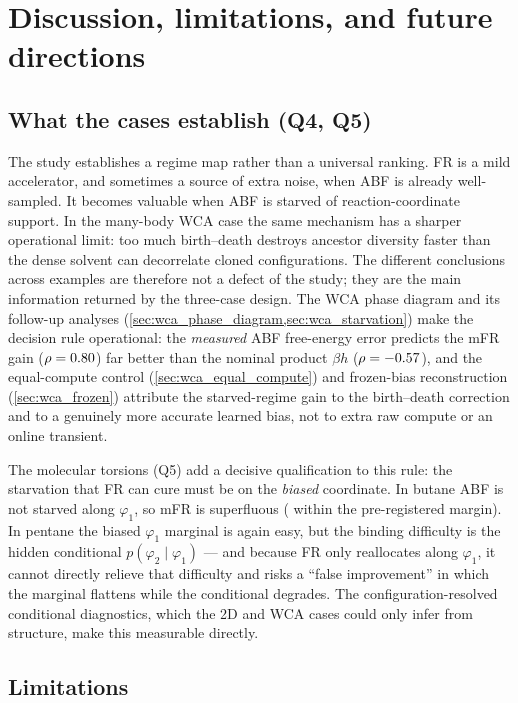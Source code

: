 \section{Discussion, limitations, and future directions}
\label{sec:discussion}

\subsection{What the cases establish (Q4, Q5)}
The study establishes a regime map rather than a universal ranking. FR is a mild
accelerator, and sometimes a source of extra noise, when ABF is already
well-sampled. It becomes valuable when ABF is starved of reaction-coordinate
support. In the many-body WCA case the same mechanism has a sharper operational
limit: too much birth--death destroys ancestor diversity faster than the dense
solvent can decorrelate cloned configurations. The different conclusions across
examples are therefore not a defect of the study; they are the main information
returned by the three-case design. The WCA phase diagram and its follow-up
analyses (\cref{sec:wca_phase_diagram,sec:wca_starvation}) make the decision rule
operational: the \emph{measured} ABF free-energy error predicts the mFR gain
($\rho=0.80$) far better than the nominal product $\beta h$
($\rho=-0.57$), and the equal-compute control (\cref{sec:wca_equal_compute})
and frozen-bias reconstruction (\cref{sec:wca_frozen}) attribute the starved-regime
gain to the birth--death correction and to a genuinely more accurate learned bias,
not to extra raw compute or an online transient.

The molecular torsions (Q5) add a decisive qualification to this rule: the starvation
that FR can cure must be on the \emph{biased} coordinate. In butane ABF is not starved
along $\varphi_1$, so mFR is superfluous (\textbf{\AlkButaneVerdict} within the
pre-registered margin). In pentane the biased $\varphi_1$ marginal is again easy, but
the binding difficulty is the hidden conditional $p(\varphi_2\mid\varphi_1)$ --- and
because FR only reallocates along $\varphi_1$, it cannot directly relieve that
difficulty and risks a ``false improvement'' in which the marginal flattens while the
conditional degrades. The configuration-resolved conditional diagnostics, which the
2D and WCA cases could only infer from structure, make this measurable directly.

\subsection{Limitations}
\label{sec:limits}

